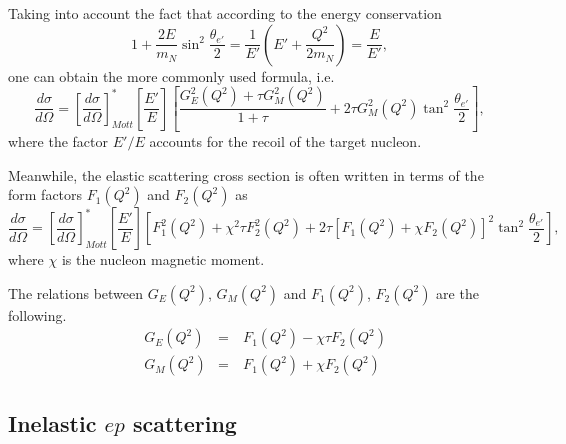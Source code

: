  
Taking into account the fact that according to the energy conservation
\begin{equation}
1+\frac{2E}{m_{N}}\sin^{2} \frac{\theta_{e'}}{2} = \frac{1}{E'}\left ( E' + \frac{Q^{2}}{2m_{N}} \right ) = \frac{E}{E'}, 
\end{equation}
one can obtain the more commonly used formula, i.e. 
\begin{equation}
\frac{d\sigma}{d\Omega} = \left [ \frac{d\sigma}{d\Omega} \right ]^{*}_{Mott} \left [ \frac{E'}{E} \right ]   \left [ \frac{G_{E}^{2}(Q^{2}) + \tau G_{M}^{2}(Q^{2}) }{1+\tau} + 2\tau G_{M}^{2}(Q^{2}) \tan^{2}{\frac{\theta_{e'}}{2}} \right ],\label{eq_p_elast3}
\end{equation}
where the factor $E'/E$ accounts for the recoil of the target nucleon.


Meanwhile, the elastic scattering cross section is often written in terms of the form factors $F_{1}(Q^{2})$ and $F_{2}(Q^{2})$ as
\begin{equation}
\frac{d\sigma}{d\Omega} = \left [ \frac{d\sigma}{d\Omega} \right ]^{*}_{Mott} \left [ \frac{E'}{E} \right ]   \left [ F^{2}_{1}(Q^{2}) + \chi^{2} \tau F^{2}_{2}(Q^{2})  + 2\tau \left [F_{1}(Q^{2}) + \chi F_{2}(Q^{2}) \right ]^{2} \tan^{2}{\frac{\theta_{e'}}{2}} \right ],\label{eq_p_elast3}
\end{equation}
where $\chi$ is the nucleon magnetic moment.


The relations between $G_{E}(Q^{2})$,  $G_{M}(Q^{2})$ and $F_{1}(Q^{2})$, $F_{2}(Q^{2})$ are the following.
\begin{equation}
\begin{aligned}
&G_{E}(Q^{2}) &=~& F_{1}(Q^{2}) - \chi \tau F_{2}(Q^{2})\\
&G_{M}(Q^{2}) &=~& F_{1}(Q^{2}) + \chi F_{2}(Q^{2})
\label{eq:el_f1_f2}
\end{aligned}
\end{equation}

\subsection*{Inelastic $ep$ scattering}


